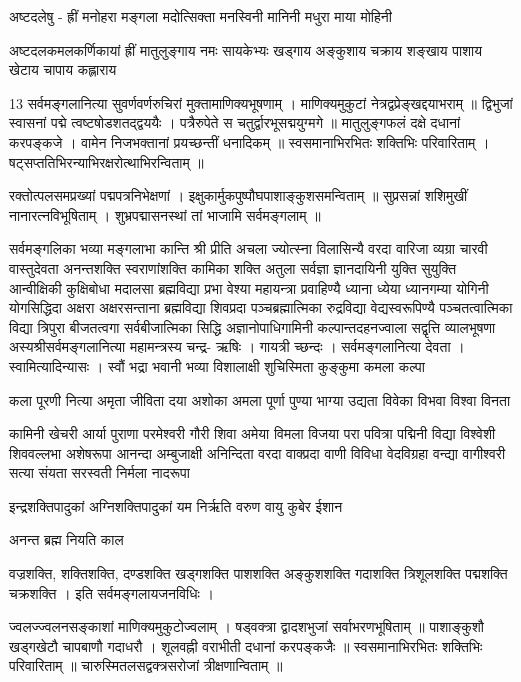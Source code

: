 अष्टदलेषु -
ह्रीं मनोहरा मङ्गला मदोत्सिक्ता मनस्विनी मानिनी मधुरा माया मोहिनी 

अष्टदलकमलकर्णिकायां 
ह्रीं मातुलुङ्गाय नमः सायकेभ्यः खड्गाय अङ्कुशाय चक्राय शङ्खाय पाशाय खेटाय चापाय कह्लाराय 

13 सर्वमङ्गलानित्या 
सुवर्णवर्णरुचिरां मुक्तामाणिक्यभूषणाम् । माणिक्यमुकुटां नेत्रद्वप्रेङ्खद्दयाभराम् ॥
द्विभुजां स्वासनां पद्मे त्वष्टषोडशतद्द्वययैः । पत्रैरुपेते स चतुर्द्वारभूसद्मयुग्मगे ॥
मातुलुङ्गफलं दक्षे दधानां करपङ्कजे । वामेन निजभक्तानां प्रयच्छन्तीं धनादिकम् ॥
स्वसमानाभिरभितः शक्तिभिः परिवारिताम् । षट्सप्ततिभिरन्याभिरक्षरोत्थाभिरन्विताम् ॥

रक्तोत्पलसमप्रख्यां पद्मपत्रनिभेक्षणां । इक्षुकार्मुकपुष्पौघपाशाङ्कुशसमन्विताम् ॥
सुप्रसन्नां शशिमुखीं नानारत्नविभूषिताम् । शुभ्रपद्मासनस्थां तां भाजामि सर्वमङ्गलाम् ॥

सर्वमङ्गलिका भव्या मङ्गलाभा कान्ति श्री प्रीति अचला ज्योत्स्ना विलासिन्यै वरदा वारिजा व्यग्रा चारवी वास्तुदेवता अनन्तशक्ति स्वराणांशक्ति कामिका शक्ति अतुला सर्वज्ञा ज्ञानदायिनी युक्ति   सुयुक्ति आन्वीक्षिकी कुक्षिबोधा मदालसा ब्रह्मविद्या प्रभा वेश्या महायन्त्रा प्रवाहिण्यै ध्याना ध्येया ध्यानगम्या योगिनी योगसिद्धिदा अक्षरा अक्षरसन्ताना ब्रह्मविद्या शिवप्रदा पञ्चब्रह्मात्मिका रुद्रविद्या वेद्यस्वरूपिण्यै पञ्चतत्वात्मिका विद्या त्रिपुरा बीजतत्वगा सर्वबीजात्मिका सिद्धि अज्ञानोपाधिगामिनी कल्पान्तदहनज्वाला सद्वृत्ति व्यालभूषणा 
अस्यश्रीसर्वमङ्गलानित्या महामन्त्रस्य चन्द्र- ऋषिः । गायत्री च्छन्दः । सर्वमङ्गलानित्या देवता । 
स्वामित्यादिन्यासः ।
स्वौं
भद्रा भवानी भव्या विशालाक्षी शुचिस्मिता कुङ्कुमा कमला कल्पा 

कला पूरणी  नित्या अमृता जीविता दया अशोका अमला पूर्णा पुण्या भाग्या उद्यता विवेका विभवा विश्वा विनता 

कामिनी खेचरी आर्या पुराणा परमेश्वरी गौरी शिवा अमेया विमला विजया परा पवित्रा पद्मिनी विद्या विश्वेशी शिववल्लभा अशेषरूपा आनन्दा अम्बुजाक्षी अनिन्दिता वरदा वाक्प्रदा वाणी विविधा वेदविग्रहा वन्द्या वागीश्वरी सत्या संयता सरस्वती निर्मला नादरूपा 

इन्द्रशक्तिपादुकां अग्निशक्तिपादुकां यम निर्ऋति वरुण वायु कुबेर ईशान 								

अनन्त ब्रह्म नियति काल 				
																		
वज्रशक्ति, शक्तिशक्ति, दण्डशक्ति खड्गशक्ति पाशशक्ति अङ्कुशशक्ति गदाशक्ति त्रिशूलशक्ति पद्मशक्ति चक्रशक्ति ।
इति सर्वमङ्गलायजनविधिः ।

ज्वलज्ज्वलनसङ्काशां माणिक्यमुकुटोज्वलाम् । षड्वक्त्रा द्वादशभुजां सर्वाभरणभूषिताम् ॥
पाशाङ्कुशौ खड्गखेटौ चापबाणौ गदाधरौ । शूलवह्नी वराभीती दधानां करपङ्कजैः ॥
स्वसमानाभिरभितः शक्तिभिः परिवारिताम् ॥ चारुस्मितलसद्वक्त्रसरोजां त्रीक्षणान्विताम् ॥

